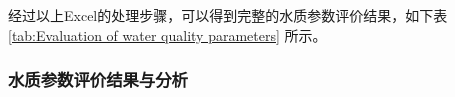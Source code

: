 经过以上Excel的处理步骤，可以得到完整的水质参数评价结果，如下表 \ref{tab:Evaluation of water quality parameters} 所示。


\subsubsection{水质参数评价结果与分析}
